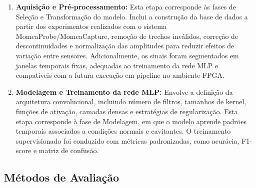 \begin{enumerate}
	\item \textbf{Aquisição e Pré-processamento:}  
	Esta etapa corresponde às fases de Seleção e Transformação do modelo.  
	Inclui a construção da base de dados a partir dos experimentos realizados 
	com o sistema MomeaProbe/MomeaCapture, remoção de trechos inválidos, 
	correção de descontinuidades e normalização das amplitudes para reduzir 
	efeitos de variação entre sensores.  
	Adicionalmente, os sinais foram segmentados em janelas temporais fixas, 
	adequadas ao treinamento da rede MLP e compatíveis com a futura execução em 
	pipeline no ambiente FPGA.
	
	\item \textbf{Modelagem e Treinamento da rede MLP:}  
	Envolve a definição da arquitetura convolucional, incluindo número de 
	filtros, tamanhos de kernel, funções de ativação, camadas densas e 
	estratégias de regularização.  
	Esta etapa corresponde à fase de Modelagem, em que o modelo aprende 
	padrões temporais associados a condições normais e cavitantes.  
	O treinamento supervisionado foi conduzido com métricas padronizadas, 
	como acurácia, F1-score e matriz de confusão.
	
%	
\end{enumerate}

\subsection{Métodos de Avaliação}

